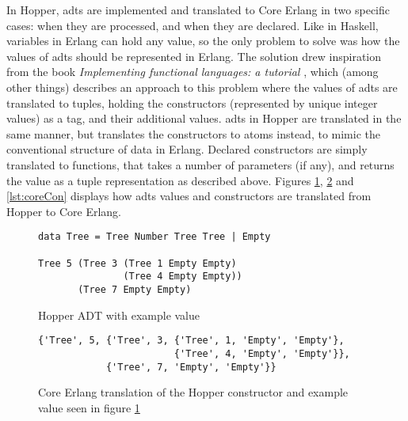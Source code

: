 In Hopper, \glspl{adt} are implemented and translated to Core Erlang in two specific cases: when they are processed, and when they are declared. Like in Haskell, variables in Erlang can
hold any value, so the only problem to solve was how the values of \glspl{adt} should be represented in Erlang. The solution drew inspiration from the book \textit{Implementing functional languages: a tutorial} \cite{FunTutorial}, which (among other things) describes an approach to this problem where the values of \glspl{adt} are translated to tuples, holding the constructors (represented by unique integer values) as a tag, and their additional values. \Glspl{adt} in Hopper are translated in the same manner, but translates the constructors to atoms instead, to mimic the conventional structure of data in Erlang. Declared constructors are simply translated to functions, that takes a number of parameters (if any), and returns the value as a tuple representation as described above. Figures \ref{lst:hopperAdt}, \ref{lst:coreAdt} and \ref{lst:coreCon} displays how \glspl{adt} values and constructors are translated from Hopper to Core Erlang.

\begin{figure}[!htb]
\centering
\begin{lstlisting} 
data Tree = Tree Number Tree Tree | Empty

Tree 5 (Tree 3 (Tree 1 Empty Empty) 
               (Tree 4 Empty Empty)) 
       (Tree 7 Empty Empty)
\end{lstlisting}
\caption{Hopper ADT with example value}
\label{lst:hopperAdt}
\end{figure}

\begin{figure}[!htb]
\centering
\begin{lstlisting} 
{'Tree', 5, {'Tree', 3, {'Tree', 1, 'Empty', 'Empty'},
                        {'Tree', 4, 'Empty', 'Empty'}},
            {'Tree', 7, 'Empty', 'Empty'}}
\end{lstlisting}
\caption[Core Erlang translation of constructor and example value]
 {Core Erlang translation of the Hopper constructor and example value seen in figure \ref{lst:hopperAdt}}
\label{lst:coreAdt}
\end{figure}

